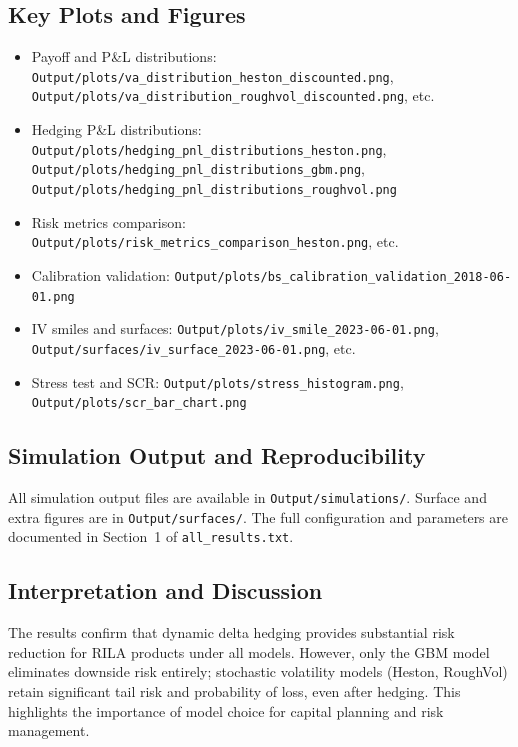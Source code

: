 \documentclass[12pt,a4paper]{report}
\begin{document}
\subsection{Key Plots and Figures}
\label{sec:plots}

\begin{itemize}
    \item Payoff and P\&L distributions: \texttt{Output/plots/va\_distribution\_heston\_discounted.png}, \texttt{Output/plots/va\_distribution\_roughvol\_discounted.png}, etc.
    \item Hedging P\&L distributions: \texttt{Output/plots/hedging\_pnl\_distributions\_heston.png}, \texttt{Output/plots/hedging\_pnl\_distributions\_gbm.png}, \texttt{Output/plots/hedging\_pnl\_distributions\_roughvol.png}
    \item Risk metrics comparison: \texttt{Output/plots/risk\_metrics\_comparison\_heston.png}, etc.
    \item Calibration validation: \texttt{Output/plots/bs\_calibration\_validation\_2018-06-01.png}
    \item IV smiles and surfaces: \texttt{Output/plots/iv\_smile\_2023-06-01.png}, \texttt{Output/surfaces/iv\_surface\_2023-06-01.png}, etc.
    \item Stress test and SCR: \texttt{Output/plots/stress\_histogram.png}, \texttt{Output/plots/scr\_bar\_chart.png}
\end{itemize}

\subsection{Simulation Output and Reproducibility}

All simulation output files are available in \texttt{Output/simulations/}. Surface and extra figures are in \texttt{Output/surfaces/}. The full configuration and parameters are documented in Section~1 of \texttt{all\_results.txt}.

\subsection{Interpretation and Discussion}

The results confirm that dynamic delta hedging provides substantial risk reduction for RILA products under all models. However, only the GBM model eliminates downside risk entirely; stochastic volatility models (Heston, RoughVol) retain significant tail risk and probability of loss, even after hedging. This highlights the importance of model choice for capital planning and risk management.
\end{document}
